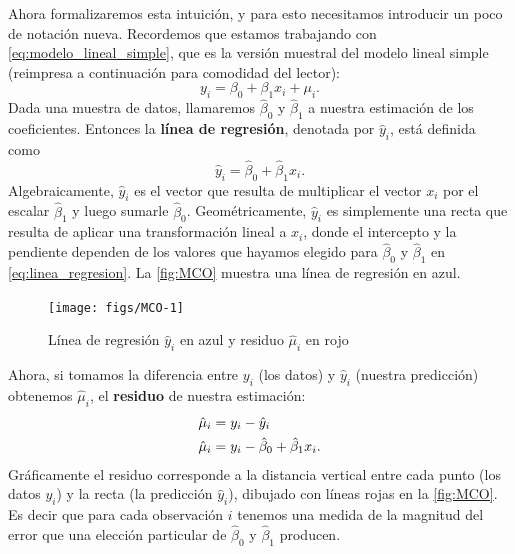 \documentclass[12pt]{report}\usepackage[]{graphicx}\usepackage[]{color}
\newenvironment{knitrout}{}{} %
\newcommand*{\kw}[1]{\textbf{#1}\index{#1}}
\begin{document}

Ahora formalizaremos esta intuición, y para esto necesitamos introducir un poco de notación nueva.
Recordemos que estamos trabajando con \eqref{eq:modelo_lineal_simple}, que es la versión muestral del modelo lineal simple (reimpresa a continuación para comodidad del lector):
\begin{equation*}
y_i = \beta_0 + \beta_1 x_i + \mu_i.
\end{equation*}
Dada una muestra de datos, llamaremos $\hat\beta_0$ y $\hat\beta_1$ a nuestra estimación de los coeficientes.
Entonces la \kw{línea de regresión}, denotada por $\hat y_i$, está definida como
\begin{equation}
\hat y_i = \hat{\beta}_0 + \hat\beta_1 x_i.
\label{eq:linea_regresion}
\end{equation}
Algebraicamente, $\hat y_i$ es el vector que resulta de multiplicar el vector $x_i$ por el escalar $\hat\beta_1$ y luego sumarle $\hat\beta_0$.
Geométricamente, $\hat y_i$ es simplemente una recta que resulta de aplicar una transformación lineal a $x_i$, donde el intercepto y la pendiente dependen de los valores que hayamos elegido para $\hat\beta_0$ y $\hat\beta_1$ en \eqref{eq:linea_regresion}. La \autoref{fig:MCO} muestra una línea de regresión en azul.

\begin{knitrout}
\color{fgcolor}\begin{figure}[htb]

{\centering \texttt{[image: figs/MCO-1]} 

}

\caption[Línea de regresión $\hat y_i$ en azul y residuo $\hat \mu_i$ en rojo]{Línea de regresión $\hat y_i$ en azul y residuo $\hat \mu_i$ en rojo}\label{fig:MCO}
\end{figure}


\end{knitrout}

Ahora, si tomamos la diferencia entre $y_i$ (los datos) y $\hat y_i$ (nuestra predicción) obtenemos $\hat\mu_i$, el \kw{residuo} de nuestra estimación:
\begin{align}
\hat \mu_i &= y_i - \hat y_i \notag \\
\hat \mu_i &= y_i - \hat\beta_0 + \hat\beta_1 x_i.
\label{eq:residuos}
\end{align}
Gráficamente el residuo corresponde a la distancia vertical entre cada punto (los datos $y_i$) y la recta (la predicción $\hat y_i$), dibujado con líneas rojas en la \autoref{fig:MCO}.
Es decir que para cada observación $i$ tenemos una medida de la magnitud del error que una elección particular de $\hat\beta_0$ y $\hat\beta_1$ producen.
\end{document}
